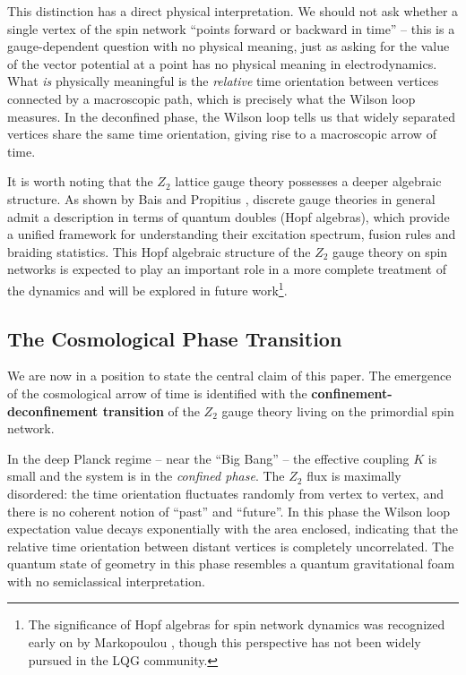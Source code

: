 \documentclass[preprint]{SciPost}
\theoremstyle{plain} %
\begin{document}
This distinction has a direct physical interpretation. We should not ask whether a single vertex of the spin network ``points forward or backward in time'' -- this is a gauge-dependent question with no physical meaning, just as asking for the value of the vector potential at a point has no physical meaning in electrodynamics. What \emph{is} physically meaningful is the \emph{relative} time orientation between vertices connected by a macroscopic path, which is precisely what the Wilson loop measures. In the deconfined phase, the Wilson loop tells us that widely separated vertices share the same time orientation, giving rise to a macroscopic arrow of time.

It is worth noting that the $ Z_2 $ lattice gauge theory possesses a deeper algebraic structure. As shown by Bais and Propitius \cite{Propitius1996Discrete}, discrete gauge theories in general admit a description in terms of quantum doubles (Hopf algebras), which provide a unified framework for understanding their excitation spectrum, fusion rules and braiding statistics. This Hopf algebraic structure of the $ Z_2 $ gauge theory on spin networks is expected to play an important role in a more complete treatment of the dynamics and will be explored in future work\footnote{The significance of Hopf algebras for spin network dynamics was recognized early on by Markopoulou \cite{Markopoulou1997Dual,Markopoulou2000Quantum}, though this perspective has not been widely pursued in the LQG community.}.

\subsection{The Cosmological Phase Transition}\label{subsec:cosmological-transition}

We are now in a position to state the central claim of this paper. The emergence of the cosmological arrow of time is identified with the \textbf{confinement-deconfinement transition} of the $ Z_2 $ gauge theory living on the primordial spin network.

In the deep Planck regime -- near the ``Big Bang'' -- the effective coupling $ K $ is small and the system is in the \emph{confined phase}. The $ Z_2 $ flux is maximally disordered: the time orientation fluctuates randomly from vertex to vertex, and there is no coherent notion of ``past'' and ``future''. In this phase the Wilson loop expectation value decays exponentially with the area enclosed, indicating that the relative time orientation between distant vertices is completely uncorrelated. The quantum state of geometry in this phase resembles a quantum gravitational foam with no semiclassical interpretation.
\end{document}
